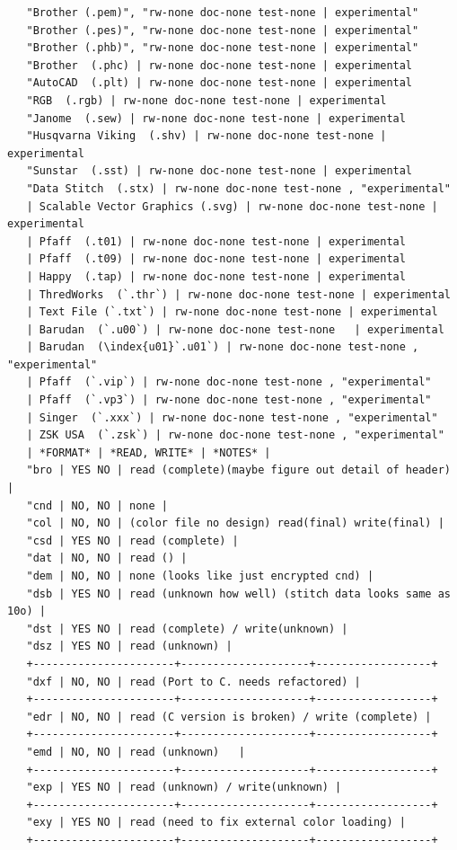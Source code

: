 \documentclass[11pt]{report}
\begin{document}
\begin{verbatim}
   "Brother (.pem)", "rw-none doc-none test-none | experimental"
   "Brother (.pes)", "rw-none doc-none test-none | experimental"
   "Brother (.phb)", "rw-none doc-none test-none | experimental"
   "Brother  (.phc) | rw-none doc-none test-none | experimental
   "AutoCAD  (.plt) | rw-none doc-none test-none | experimental
   "RGB  (.rgb) | rw-none doc-none test-none | experimental
   "Janome  (.sew) | rw-none doc-none test-none | experimental
   "Husqvarna Viking  (.shv) | rw-none doc-none test-none | experimental
   "Sunstar  (.sst) | rw-none doc-none test-none | experimental
   "Data Stitch  (.stx) | rw-none doc-none test-none , "experimental"
   | Scalable Vector Graphics (.svg) | rw-none doc-none test-none | experimental
   | Pfaff  (.t01) | rw-none doc-none test-none | experimental
   | Pfaff  (.t09) | rw-none doc-none test-none | experimental
   | Happy  (.tap) | rw-none doc-none test-none | experimental
   | ThredWorks  (`.thr`) | rw-none doc-none test-none | experimental
   | Text File (`.txt`) | rw-none doc-none test-none | experimental
   | Barudan  (`.u00`) | rw-none doc-none test-none   | experimental
   | Barudan  (\index{u01}`.u01`) | rw-none doc-none test-none , "experimental"
   | Pfaff  (`.vip`) | rw-none doc-none test-none , "experimental"
   | Pfaff  (`.vp3`) | rw-none doc-none test-none , "experimental"
   | Singer  (`.xxx`) | rw-none doc-none test-none , "experimental"
   | ZSK USA  (`.zsk`) | rw-none doc-none test-none , "experimental"
   | *FORMAT* | *READ, WRITE* | *NOTES* |
   "bro | YES NO | read (complete)(maybe figure out detail of header) |
   "cnd | NO, NO | none |
   "col | NO, NO | (color file no design) read(final) write(final) |
   "csd | YES NO | read (complete) |
   "dat | NO, NO | read () |
   "dem | NO, NO | none (looks like just encrypted cnd) |
   "dsb | YES NO | read (unknown how well) (stitch data looks same as 10o) |
   "dst | YES NO | read (complete) / write(unknown) |
   "dsz | YES NO | read (unknown) |
   +----------------------+--------------------+------------------+
   "dxf | NO, NO | read (Port to C. needs refactored) |
   +----------------------+--------------------+------------------+
   "edr | NO, NO | read (C version is broken) / write (complete) |
   +----------------------+--------------------+------------------+
   "emd | NO, NO | read (unknown)   |
   +----------------------+--------------------+------------------+
   "exp | YES NO | read (unknown) / write(unknown) |
   +----------------------+--------------------+------------------+
   "exy | YES NO | read (need to fix external color loading) |
   +----------------------+--------------------+------------------+

\end{verbatim}
\end{document}

